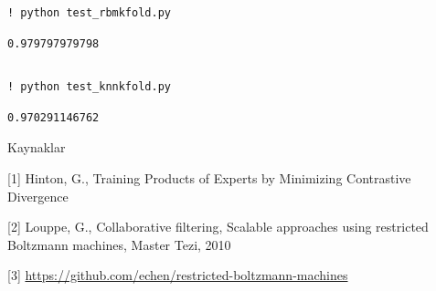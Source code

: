 \documentclass[12pt,fleqn]{article}\usepackage{../common}
\begin{document}
\begin{verbatim}
! python test_rbmkfold.py
\end{verbatim}

\begin{verbatim}
0.979797979798
\end{verbatim}

\inputminted[fontsize=\footnotesize]{python}{test_knnkfold.py}

\begin{verbatim}
! python test_knnkfold.py
\end{verbatim}

\begin{verbatim}
0.970291146762
\end{verbatim}

Kaynaklar

[1] Hinton, G., Training Products of Experts by Minimizing Contrastive
Divergence

[2] Louppe, G., Collaborative filtering, Scalable approaches using
restricted Boltzmann machines, Master Tezi, 2010

[3] \url{https://github.com/echen/restricted-boltzmann-machines}
\end{document}
